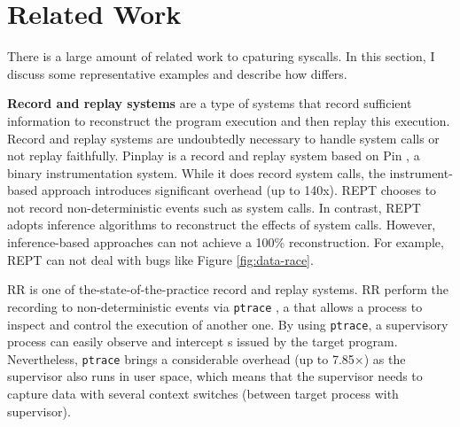 \section{Related Work}

There is a large amount of related work to cpaturing syscalls. In this section, I discuss some representative examples and describe
how \TheName differs.

\textbf{Record and replay systems} are a type of systems that record sufficient information to reconstruct the program execution and then replay this execution. Record and replay systems are undoubtedly necessary to handle system calls or not replay faithfully.
Pinplay \cite{patil_pinplay_2010} is a record and replay system based on Pin  \cite{reddi_pin_2004}, a binary instrumentation system. While it does record system calls, the instrument-based approach introduces significant overhead (up to 140x). REPT \cite{cui_rept_2018} chooses to not record non-deterministic events such as system calls. In contrast, REPT adopts inference algorithms to reconstruct the effects of system calls. However, inference-based approaches can not achieve a 100\% reconstruction. For example, REPT can not deal with bugs like Figure \ref{fig:data-race}.

RR \cite{203227} is one of the-state-of-the-practice record and replay systems. RR perform the recording to non-deterministic events via \texttt{ptrace} \cite{ptrace2},
a \syscall{}
that allows a process to inspect and control the execution of another
one.
By using \texttt{ptrace}, a supervisory process can easily observe and intercept \syscall{}s issued by the target program.
Nevertheless,
\texttt{ptrace} brings a considerable overhead (up to 7.85×) as the supervisor also runs in
user space, 
which means that the supervisor needs to capture data with several
context switches (between target process with supervisor).


